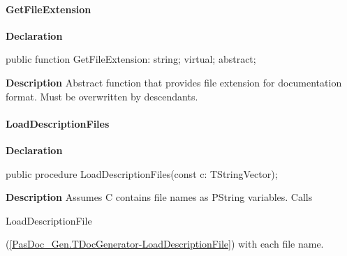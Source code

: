 \documentclass{report}
\newif\ifpdf
\begin{document}
\paragraph*{GetFileExtension}\hspace*{\fill}

\label{PasDoc_Gen.TDocGenerator-GetFileExtension}
\begin{list}{}{
\setlength{\itemindent}{0cm}
\setlength{\listparindent}{0cm}
\setlength{\leftmargin}{\evensidemargin}
\addtolength{\leftmargin}{\tmplength}
\settowidth{\labelsep}{X}
\addtolength{\leftmargin}{\labelsep}
\setlength{\labelwidth}{\tmplength}
}
\item[\textbf{Declaration}\hfill]
\ifpdf
\begin{flushleft}
\fi
\begin{ttfamily}
public function GetFileExtension: string; virtual; abstract;\end{ttfamily}

\ifpdf
\end{flushleft}
\fi

\par
\item[\textbf{Description}]
Abstract function that provides file extension for documentation format. Must be overwritten by descendants.

\end{list}
\paragraph*{LoadDescriptionFiles}\hspace*{\fill}

\label{PasDoc_Gen.TDocGenerator-LoadDescriptionFiles}
\begin{list}{}{
\setlength{\itemindent}{0cm}
\setlength{\listparindent}{0cm}
\setlength{\leftmargin}{\evensidemargin}
\addtolength{\leftmargin}{\tmplength}
\settowidth{\labelsep}{X}
\addtolength{\leftmargin}{\labelsep}
\setlength{\labelwidth}{\tmplength}
}
\item[\textbf{Declaration}\hfill]
\ifpdf
\begin{flushleft}
\fi
\begin{ttfamily}
public procedure LoadDescriptionFiles(const c: TStringVector);\end{ttfamily}

\ifpdf
\end{flushleft}
\fi

\par
\item[\textbf{Description}]
Assumes C contains file names as PString variables. Calls \begin{ttfamily}LoadDescriptionFile\end{ttfamily}(\ref{PasDoc_Gen.TDocGenerator-LoadDescriptionFile}) with each file name.

\end{list}
\end{document}
